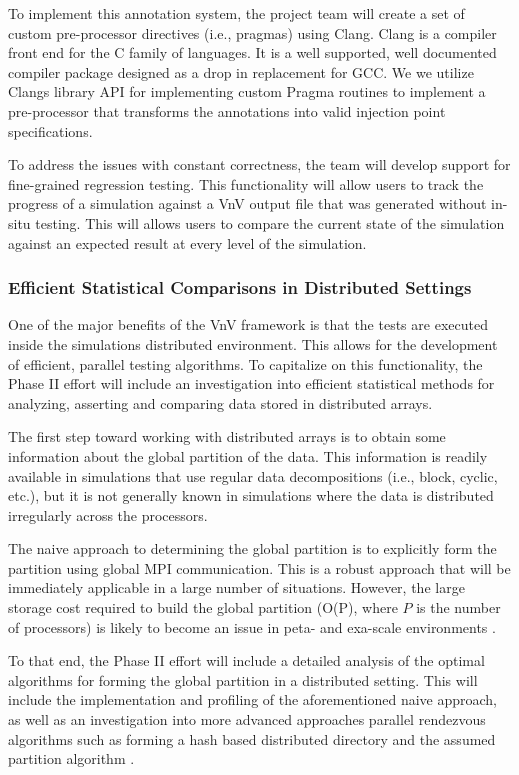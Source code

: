 To implement this annotation system, the project team will create a set of custom pre-processor directives (i.e., pragmas) using Clang. Clang is a compiler front end for the C family of languages. It is a well supported, well documented compiler package designed as a drop in replacement for GCC. We we utilize Clangs library API for implementing custom Pragma routines to implement a pre-processor that transforms the annotations into valid injection point specifications. 

To address the issues with constant correctness, the team will develop support for fine-grained regression testing. This functionality will allow users to track the progress of a simulation against a VnV output file that was generated without in-situ testing. This will allows users to compare the current state of the simulation against an expected result at every level of the simulation. 

\subsubsection{Efficient Statistical Comparisons in Distributed Settings} 

One of the major benefits of the VnV framework is that the tests are executed inside the simulations distributed environment. This allows for the development of efficient, parallel testing algorithms. To capitalize on this functionality, the Phase II effort will include an investigation into efficient statistical methods for analyzing, asserting and comparing data stored in distributed arrays. 

The first step toward working with distributed arrays is to obtain some information about the global partition of the data. This information is readily available in simulations that use regular data decompositions (i.e., block, cyclic, etc.), but it is not generally known in simulations where the data is distributed irregularly across the processors.

The naive approach to determining the global partition is to explicitly form the partition using global MPI communication. This is a robust approach that will be immediately applicable in a large number of situations. However, the large storage cost required to build the global partition (O(P), where $P$ is the number of processors) is likely to become an issue in peta- and exa-scale environments \cite{hypre-assumed}. 

To that end, the Phase II effort will include a detailed analysis of the optimal algorithms for forming the global partition in a distributed setting. This will include the implementation and profiling of the aforementioned naive approach, as well as an investigation into more advanced approaches parallel rendezvous algorithms such as forming a hash based distributed directory \cite{hypre-nine} and the assumed partition algorithm \cite{hypre-assumed}. 

